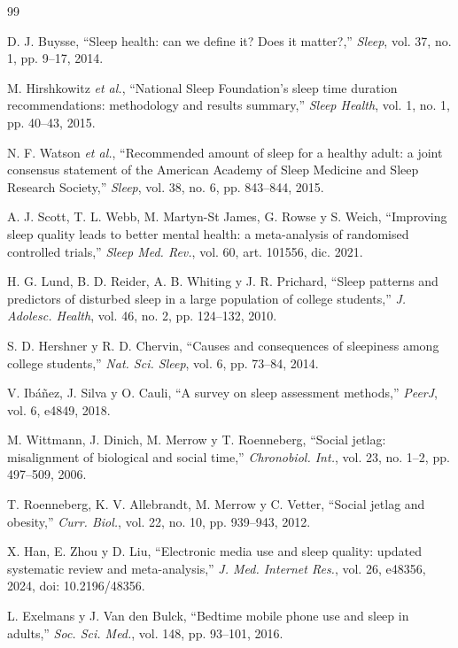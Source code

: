 \documentclass[conference]{IEEEtran}
\begin{document}
\begin{thebibliography}{99}

 D. J. Buysse, ``Sleep health: can we define it? Does it matter?,'' \emph{Sleep}, vol. 37, no. 1, pp. 9--17, 2014.

 M. Hirshkowitz \emph{et al.}, ``National Sleep Foundation's sleep time duration recommendations: methodology and results summary,'' \emph{Sleep Health}, vol. 1, no. 1, pp. 40--43, 2015.

 N. F. Watson \emph{et al.}, ``Recommended amount of sleep for a healthy adult: a joint consensus statement of the American Academy of Sleep Medicine and Sleep Research Society,'' \emph{Sleep}, vol. 38, no. 6, pp. 843--844, 2015.

 A. J. Scott, T. L. Webb, M. Martyn-St James, G. Rowse y S. Weich, ``Improving sleep quality leads to better mental health: a meta-analysis of randomised controlled trials,'' \emph{Sleep Med. Rev.}, vol. 60, art. 101556, dic. 2021.

 H. G. Lund, B. D. Reider, A. B. Whiting y J. R. Prichard, ``Sleep patterns and predictors of disturbed sleep in a large population of college students,'' \emph{J. Adolesc. Health}, vol. 46, no. 2, pp. 124--132, 2010.

 S. D. Hershner y R. D. Chervin, ``Causes and consequences of sleepiness among college students,'' \emph{Nat. Sci. Sleep}, vol. 6, pp. 73--84, 2014.

 V. Ibáñez, J. Silva y O. Cauli, ``A survey on sleep assessment methods,'' \emph{PeerJ}, vol. 6, e4849, 2018.

 M. Wittmann, J. Dinich, M. Merrow y T. Roenneberg, ``Social jetlag: misalignment of biological and social time,'' \emph{Chronobiol. Int.}, vol. 23, no. 1--2, pp. 497--509, 2006.

 T. Roenneberg, K. V. Allebrandt, M. Merrow y C. Vetter, ``Social jetlag and obesity,'' \emph{Curr. Biol.}, vol. 22, no. 10, pp. 939--943, 2012.

 X. Han, E. Zhou y D. Liu, ``Electronic media use and sleep quality: updated systematic review and meta-analysis,'' \emph{J. Med. Internet Res.}, vol. 26, e48356, 2024, doi: 10.2196/48356.

 L. Exelmans y J. Van den Bulck, ``Bedtime mobile phone use and sleep in adults,'' \emph{Soc. Sci. Med.}, vol. 148, pp. 93--101, 2016.


\end{thebibliography}
\end{document}
